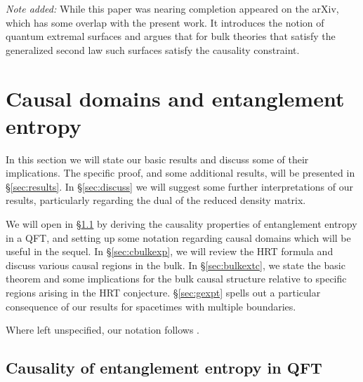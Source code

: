\documentclass[12pt]{article}
\begin{document}
\bigskip
\noindent
{\em Note added:} While this paper was nearing completion \cite{Engelhardt:2014gca} appeared on the arXiv, which has some overlap with the present work.
It introduces the notion of quantum extremal surfaces and argues that for bulk theories that satisfy the generalized second law such surfaces satisfy the causality constraint.


\section{Causal domains and entanglement entropy}
\label{sec:overview}
In this section we will state our basic results and discuss some of their implications.  The specific proof, and some additional results, will be presented in \S\ref{sec:results}.  In \S\ref{sec:discuss} we will suggest some further interpretations of our results, particularly regarding the dual of the reduced density matrix.

We will open in \S\ref{sec:cqft} by deriving the causality properties of entanglement entropy in a QFT, and setting up some notation regarding causal domains which will be useful in the sequel.  In \S\ref{sec:cbulkexp}, we will review the HRT formula and discuss various causal regions in the bulk.  In \S\ref{sec:bulkextc}, we state the basic theorem and some implications for the bulk causal structure relative to specific regions arising in the HRT conjecture. \S\ref{sec:gexpt} spells out a particular consequence of our results for spacetimes with multiple boundaries.

Where left unspecified, our notation follows \cite{Wald:1984ai}.

\subsection{Causality of entanglement entropy in QFT}
\label{sec:cqft}
\end{document}
